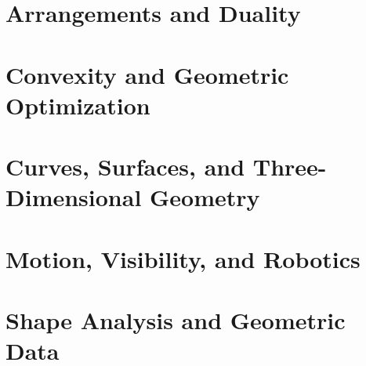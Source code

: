 \documentclass[11pt,a4paper,twoside]{book}
\begin{document}
\part{Arrangements and Duality}



\part{Convexity and Geometric Optimization}



\begingroup
\let\chapter\section

\endgroup

\part{Curves, Surfaces, and Three-Dimensional Geometry}






\part{Motion, Visibility, and Robotics}

\begingroup
\let\chapter\section

\endgroup



\part{Shape Analysis and Geometric Data}




\end{document}
